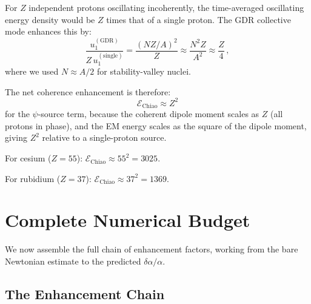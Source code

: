 \documentclass[aps,prd,twocolumn,superscriptaddress,nofootinbib]{revtex4-2}
\newcommand{\dalpha}{\delta\alpha}
\begin{document}
For $Z$ independent protons oscillating incoherently, the
time-averaged oscillating energy density would be $Z$ times that
of a single proton.  The GDR collective mode enhances this by:
\begin{equation}
\frac{u_1^{(\mathrm{GDR})}}{Z\,u_1^{(\mathrm{single})}}
= \frac{(NZ/A)^2}{Z} \approx \frac{N^2 Z}{A^2}
\approx \frac{Z}{4}\,,
\end{equation}
where we used $N \approx A/2$ for stability-valley nuclei.

The net coherence enhancement is therefore:
\begin{equation}\label{eq:Z-squared}
\boxed{\mathcal{E}_{\mathrm{Chiao}} \approx Z^2}
\end{equation}
for the $\psi$-source term, because the coherent dipole moment scales
as $Z$ (all protons in phase), and the EM energy scales as the square
of the dipole moment, giving $Z^2$ relative to a single-proton source.

For cesium ($Z = 55$): $\mathcal{E}_{\mathrm{Chiao}} \approx 55^2
= 3025$.

For rubidium ($Z = 37$): $\mathcal{E}_{\mathrm{Chiao}} \approx
37^2 = 1369$.


\section{Complete Numerical Budget}
\label{sec:budget}

We now assemble the full chain of enhancement factors, working from
the bare Newtonian estimate to the predicted $\dalpha/\alpha$.

\subsection{The Enhancement Chain}
\label{sec:chain}
\end{document}
